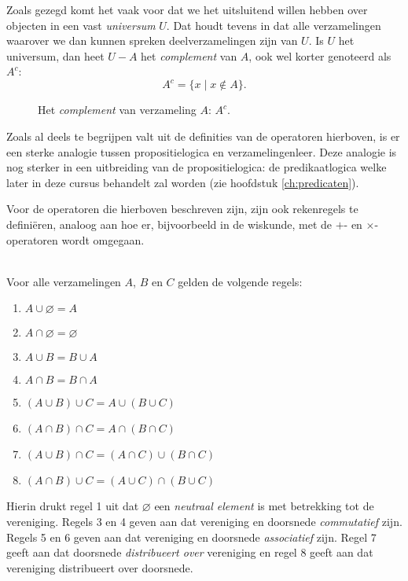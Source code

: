 Zoals gezegd komt het vaak voor dat we het uitsluitend willen hebben over objecten in een vast \textit{universum} $U$. Dat houdt tevens in dat alle verzamelingen waarover we dan kunnen spreken deelverzamelingen zijn van $U$. Is $U$ het universum, dan heet $U-A$ het \textit{complement} van $A$, ook wel korter genoteerd als $A^c$:
$$A^c=\{x\;|\;x\not\in A\}.$$
\begin{figure}[ht]
    \centering
    \caption{Het \textit{complement} van verzameling $A$: $A^c$.}
    \label{fig:complement}
\end{figure}

Zoals al deels te begrijpen valt uit de definities van de operatoren hierboven, is er een sterke analogie tussen propositielogica en verzamelingenleer. Deze analogie is nog sterker in een uitbreiding van de propositielogica: de predikaatlogica welke later in deze cursus behandelt zal worden (zie hoofdstuk \ref{ch:predicaten}). 

Voor de operatoren die hierboven beschreven zijn, zijn ook rekenregels te defini\"eren, analoog aan hoe er, bijvoorbeeld in de wiskunde, met de $+$- en $\times$-operatoren wordt omgegaan.
\begin{theorem}\mbox{}\\
Voor alle verzamelingen $A$, $B$ en $C$ gelden de volgende regels:
\begin{enumerate}
    \item $A\cup\varnothing = A$
    \item $A\cap\varnothing = \varnothing$
    \item $A\cup B=B\cup A$
    \item $A\cap B=B\cap A$
    \item $(A\cup B)\cup C=A\cup (B\cup C)$
    \item $(A\cap B)\cap C=A\cap(B\cap C)$
    \item $(A\cup B)\cap C=(A\cap C)\cup(B\cap C)$
    \item $(A\cap B)\cup C=(A\cup C)\cap(B\cup C)$
\end{enumerate}\label{th:regels}
\end{theorem}
Hierin drukt regel 1 uit dat $\varnothing$ een \textit{neutraal element} is met betrekking tot de vereniging. Regels 3 en 4 geven aan dat vereniging en doorsnede \textit{commutatief} zijn. Regels 5 en 6 geven aan dat vereniging en doorsnede \textit{associatief} zijn. Regel 7 geeft aan dat doorsnede \textit{distribueert over} vereniging en regel 8 geeft aan dat vereniging distribueert over doorsnede.

